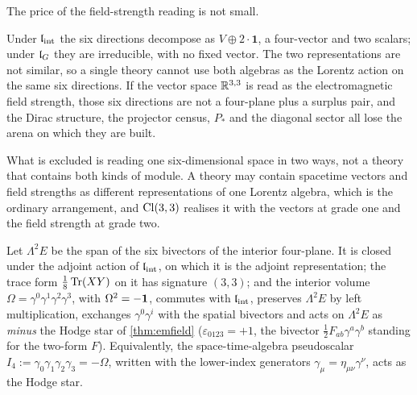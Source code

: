 \label{sec:readingsexclude}
The price of the field-strength reading is not small.

\begin{proposition}[Exclusion]
\label{prop:emexclusive}
Under $\mathfrak l_{\rm int}$ the six directions decompose as $V\oplus2\cdot\mathbf1$, a four-vector and two scalars; under $\mathfrak l_G$ they are
irreducible, with no fixed vector. The two representations are not similar, so a single theory cannot use both algebras as the
Lorentz action on the same six directions. If the vector space $\mathbb{R}^{3,3}$ is read as the electromagnetic field strength, those six
directions are not a four-plane plus a surplus pair, and the Dirac structure, the projector census, $P_*$ and the diagonal sector
all lose the arena on which they are built.
\end{proposition}

What is excluded is reading one six-dimensional space in two ways, not a theory that contains both kinds of module. A theory may
contain spacetime vectors and field strengths as different representations of one Lorentz algebra, which is the ordinary
arrangement, and $\mathrm{Cl}(3,3)$ realises it with the vectors at grade one and the field strength at grade two.

\begin{proposition}
\label{prop:bivectorF}
Let $\Lambda^2E$ be the span of the six bivectors of the interior four-plane. It is closed under the adjoint action of $\mathfrak l_{\rm int}$, on
which it is the adjoint representation; the trace form $\tfrac18\operatorname{Tr}(XY)$ on it has signature $(3,3)$; and the interior volume
$\Omega=\gamma^0\gamma^1\gamma^2\gamma^3$, with $\Omega^2=-\mathbf 1$, commutes with $\mathfrak l_{\rm int}$, preserves $\Lambda^2E$ by left multiplication,
exchanges $\gamma^0\gamma^i$ with the spatial bivectors and acts on $\Lambda^2E$ as \emph{minus} the Hodge star of \cref{thm:emfield}
($\varepsilon_{0123}=+1$, the bivector $\tfrac12F_{ab}\gamma^a\gamma^b$ standing for the two-form $F$). Equivalently, the space-time-algebra
pseudoscalar $I_4:=\gamma_0\gamma_1\gamma_2\gamma_3=-\Omega$, written with the lower-index generators $\gamma_\mu=\eta_{\mu\nu}\gamma^\nu$, acts as
the Hodge star.
\end{proposition}

